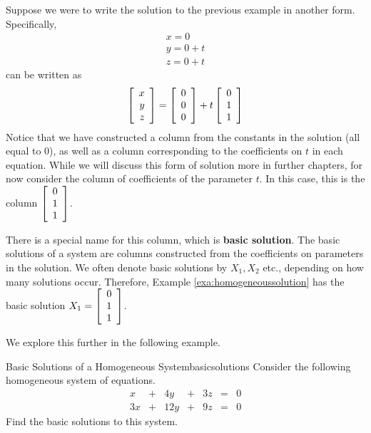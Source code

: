 Suppose we were to write the solution to the previous example in another form.
Specifically,
\begin{equation*}
\begin{array}{c}
x = 0 \\
y = 0 + t \\
z = 0 + t
\end{array}
\end{equation*}
can be written as 
\begin{equation*}
\left[
\begin{array}{r}
x\\
y\\
z
\end{array}
\right]
 =
\left[
\begin{array}{r}
0\\
0\\
0
\end{array}
\right]
 +
t
\left[
\begin{array}{r}
0\\
1\\
1
\end{array}
\right]
\end{equation*}
Notice that we have constructed a column from the constants in the solution (all equal to $0$),
 as well as a column corresponding to the 
coefficients on $t$ in each equation. While we will discuss this form of solution more in further chapters, 
for now consider the column of coefficients 
of the parameter $t$. In this case, this is the column
$\left[
\begin{array}{r}
0\\
1\\
1
\end{array}
\right]$. 

There is a special name for this column, which is \textbf{basic solution}. The basic solutions of a system 
are columns constructed from the coefficients on parameters in the solution. We often denote basic solutions 
by $X_1, X_2$ etc., depending on how many solutions occur. Therefore, Example \ref{exa:homogeneoussolution}
has the basic solution $X_1 = \left[
\begin{array}{r}
0\\
1\\
1
\end{array}
\right]$. 

We explore this further in the following example. 

\begin{example}{Basic Solutions of a Homogeneous System}{basicsolutions}
Consider the following homogeneous system of equations. 
\begin{equation*}
\begin{array}{cccccccc}
x &+& 4y &+& 3z &=& 0 \\
3x &+& 12y &+& 9z &=& 0
\end{array}
\end{equation*}
Find the basic solutions to this system.
\end{example}

